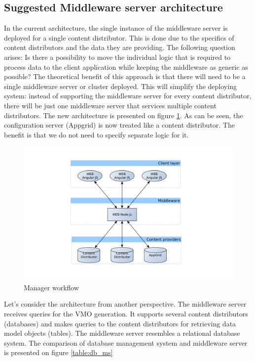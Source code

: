 \subsection{Suggested Middleware server architecture}

In the current architecture, the single instance of the middleware server is deployed for a single content distributor. This is done due to the specifics of content distributors and the data they are providing. The following question arises: Is there a possibility to move the individual logic that is required to process data to the client application while keeping the middleware as generic as possible? The theoretical benefit of this approach is that there will need to be a single middleware server or cluster deployed. This will simplify the deploying system: instead of supporting the middleware server for every content distributor, there will be just one middleware server that services multiple content distributors. The new architecture is presented on figure \ref{fig:arch_overview_new}. As can be seen, the configuration server (Appgrid) is now treated like a content distributor. The benefit is that we do not need to specify separate logic for it. 

\begin{figure}[h]
    \centering
	\includegraphics[width=\textwidth]{images/thesis_global_architecture_new.png}
    \caption{Manager workflow}
    \label{fig:arch_overview_new}
\end{figure}

Let's consider the architecture from another perspective.
The middleware server receives queries for the VMO generation. It supports several content distributors (databases) and makes queries to the content distributors for retrieving data model objects (tables). The middleware server resembles a relational database system. The comparison of database management system and middleware server is presented on figure \ref{table:db_ms}

